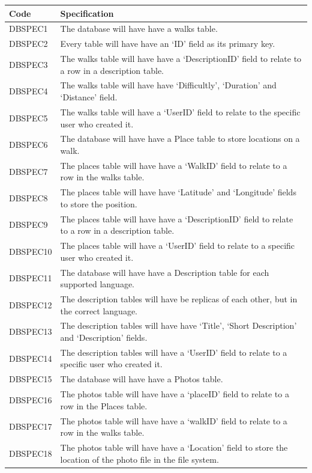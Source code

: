 \documentclass[11pt,a4paper]{article}
\begin{document}
\begin{longtable}{|p{2.5cm}p{13cm}|}
\hline
\textbf{Code} & \textbf{Specification} \\
\hline
DBSPEC1 & The database will have have a walks table.\\ \hline
DBSPEC2 & Every table will have have an `ID' field as its primary key.\\ \hline
DBSPEC3 & The walks table will have have a `DescriptionID' field to relate to a row in a description table. \\ \hline
DBSPEC4 & The walks table will have have `Difficultly',  `Duration' and `Distance' field. \\ \hline
DBSPEC5 & The walks table will have a `UserID' field to relate to the specific user who created it. \\ \hline
DBSPEC6 & The database will have have a Place table to store locations on a walk.\\ \hline
DBSPEC7 & The places table will have have a `WalkID' field to relate to a row in the walks table.\\ \hline
DBSPEC8 & The places table will have have `Latitude' and `Longitude'  fields to store the position. \\ \hline
DBSPEC9 & The places table will have have a `DescriptionID' field to relate to a row in a description table. \\ \hline
DBSPEC10 & The places table will have a `UserID' field to relate to a specific user who created it. \\\hline
DBSPEC11 & The database will have have a Description table for each supported language. \\ \hline
DBSPEC12 & The description tables will have be replicas of each other, but in the correct language. \\ \hline
DBSPEC13 & The description tables will have have `Title', `Short Description' and `Description' fields.\\ \hline
DBSPEC14 & The description tables will have a `UserID' field to relate to a specific user who created it. \\\hline
DBSPEC15 & The database will have have a Photos table.\\ \hline
DBSPEC16 & The photos table will have have a `placeID' field to relate to a row in the Places table. \\ \hline
DBSPEC17 & The photos table will have have a `walkID' field to relate to a row in the walks table.\\ \hline
DBSPEC18 & The photos table will have have a `Location' field to store the location of the photo file in the file system.\\ \hline

\end{longtable}
\end{document}
